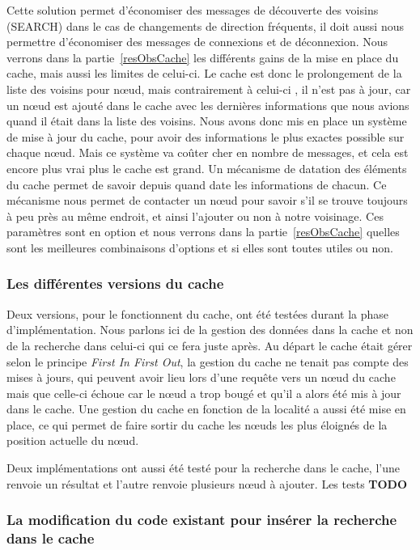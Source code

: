 \par Cette solution permet d'économiser des messages de découverte des voisins (SEARCH) dans le cas de changements de direction fréquents, il doit aussi nous permettre d'économiser des messages de connexions et de déconnexion. Nous verrons dans la partie~\ref{resObsCache} les différents gains de la mise en place du cache, mais aussi les limites de celui-ci. Le cache est donc le prolongement de la liste des voisins pour nœud, mais contrairement à celui-ci , il n'est pas à jour, car un nœud est ajouté dans le cache avec les dernières informations que nous avions quand il était dans la liste des voisins. Nous avons donc mis en place un système de mise à jour du cache, pour avoir des informations le plus exactes possible sur chaque nœud. Mais ce système va coûter cher en nombre de messages, et cela est encore plus vrai plus le cache est grand. Un mécanisme de datation des éléments du cache permet de savoir depuis quand date les informations de chacun. Ce mécanisme nous permet de contacter un nœud pour savoir s'il se trouve toujours à peu près au même endroit, et ainsi l'ajouter ou non à notre voisinage. Ces paramètres sont en option et nous verrons dans la partie~\ref{resObsCache} quelles sont les meilleures combinaisons d'options et si elles sont toutes utiles ou non.

\subsubsection{Les différentes versions du cache}

Deux versions, pour le fonctionnent du cache, ont été testées durant la phase d'implémentation. Nous parlons ici de la gestion des données dans la cache et non de la recherche dans celui-ci qui ce fera juste après. Au départ le cache était gérer selon le principe \textit{First In First Out}, la gestion du cache ne tenait pas compte des mises à jours, qui peuvent avoir lieu lors d'une requête vers un nœud du cache mais que celle-ci échoue car le nœud a trop bougé et qu'il a alors été mis à jour dans le cache. Une gestion du cache en fonction de la localité a aussi été mise en place, ce qui permet de faire sortir du cache les nœuds les plus éloignés de la position actuelle du nœud.
\par Deux implémentations ont aussi été testé pour la recherche dans le cache, l'une renvoie un résultat et l'autre renvoie plusieurs nœud à ajouter. Les tests \textbf{TODO}


\subsubsection{La modification du code existant pour insérer la recherche dans le cache}

